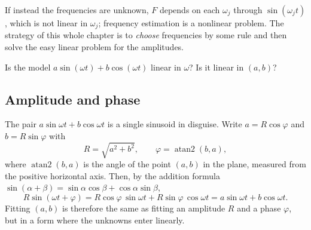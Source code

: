 If instead the frequencies are unknown, $F$ depends on each $\omega_j$ through $\sin(\omega_j t)$, which is not linear in $\omega_j$; frequency estimation is a nonlinear problem. The strategy of this whole chapter is to \emph{choose} frequencies by some rule and then solve the easy linear problem for the amplitudes.

\begin{checkpoint}
Is the model $a\sin(\omega t)+b\cos(\omega t)$ linear in $\omega$? Is it linear in $(a,b)$?
\end{checkpoint}

\subsection{Amplitude and phase}

The pair $a\sin\omega t+b\cos\omega t$ is a single sinusoid in disguise. Write $a=R\cos\varphi$ and $b=R\sin\varphi$ with
\begin{equation}
R=\sqrt{a^2+b^2},\qquad \varphi=\operatorname{atan2}(b,a),
\label{eq:sparse-frequency-ampphase}
\end{equation}
where $\operatorname{atan2}(b,a)$ is the angle of the point $(a,b)$ in the plane, measured from the positive horizontal axis. Then, by the addition formula $\sin(\alpha+\beta)=\sin\alpha\cos\beta+\cos\alpha\sin\beta$,
\begin{equation}
R\sin(\omega t+\varphi)=R\cos\varphi\,\sin\omega t+R\sin\varphi\,\cos\omega t=a\sin\omega t+b\cos\omega t .
\end{equation}
Fitting $(a,b)$ is therefore the same as fitting an amplitude $R$ and a phase $\varphi$, but in a form where the unknowns enter linearly.

